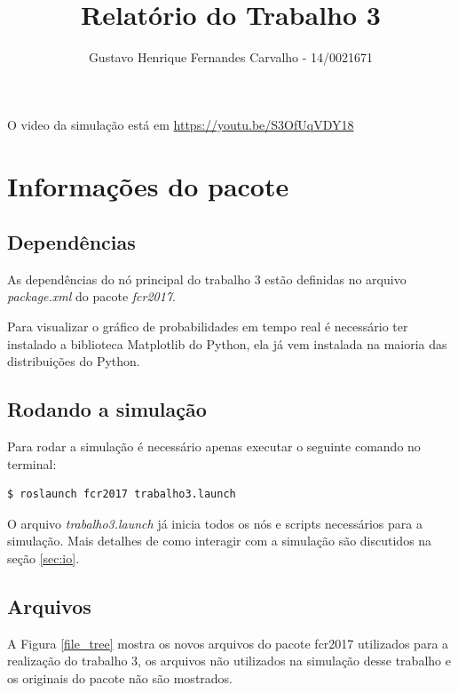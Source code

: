 \documentclass{llncs}
\begin{document}
\title{Relatório do Trabalho 3}
\author{Gustavo Henrique Fernandes Carvalho - 14/0021671}
\maketitle


O video da simulação está em \url{https://youtu.be/S3OfUqVDY18}


\section{Informações do pacote}
\subsection{Dependências}
As dependências do nó principal do trabalho 3 estão definidas no arquivo \textit{package.xml} do pacote \textit{fcr2017}.

Para visualizar o gráfico de probabilidades em tempo real é necessário ter instalado a biblioteca Matplotlib do Python, ela já vem instalada na maioria das distribuições do Python.


\subsection{Rodando a simulação} \label{sec:run}
Para rodar a simulação é necessário apenas executar o seguinte comando no terminal:
\begin{lstlisting}[language=bash]
	$ roslaunch fcr2017 trabalho3.launch
\end{lstlisting}
O arquivo \textit{trabalho3.launch} já inicia todos os nós e scripts necessários para a simulação. Mais detalhes de como interagir com a simulação são discutidos na seção \ref{sec:io}.



\subsection{Arquivos}
A Figura \ref{file_tree} mostra os novos arquivos do pacote fcr2017 utilizados para a realização do trabalho 3, os arquivos não utilizados na simulação desse trabalho e os originais do pacote não são mostrados.
\end{document}
